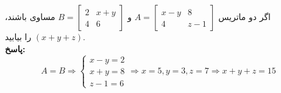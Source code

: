 \begin{example}
	اگر دو ماتریس
	$A = \begin{bmatrix}
		x-y & 8 \\
		4 & z-1
	\end{bmatrix}$
	و
	$B = \begin{bmatrix}
		2 & x+y \\
		4 & 6
	\end{bmatrix}$
	مساوی باشند،
	$(x+y+z)$
	را بیابید. \\
	\textbf{پاسخ:}
	\[
	A=B \Rightarrow
	\begin{cases}
		x-y=2 \\
		x+y=8 \\
		z-1=6
	\end{cases}
	\Rightarrow
	x=5 , y=3 , z=7
	\Rightarrow
	x+y+z=15
	\]
\end{example}


